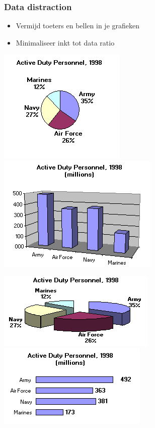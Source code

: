 \documentclass{beamer}
\begin{document}
\begin{frame}
  \frametitle{Data distraction}

  \begin{itemize}
    \item Vermijd toeters en bellen in je grafieken
    \item Minimaliseer inkt tot data ratio
  \end{itemize}

  \centering
  \includegraphics[width=.4\textwidth]{img/les2-04}
  \includegraphics[width=.4\textwidth]{img/les2-05}

  \includegraphics[width=.4\textwidth]{img/les2-06}
  \includegraphics[width=.4\textwidth]{img/les2-07}
\end{frame}
\end{document}
